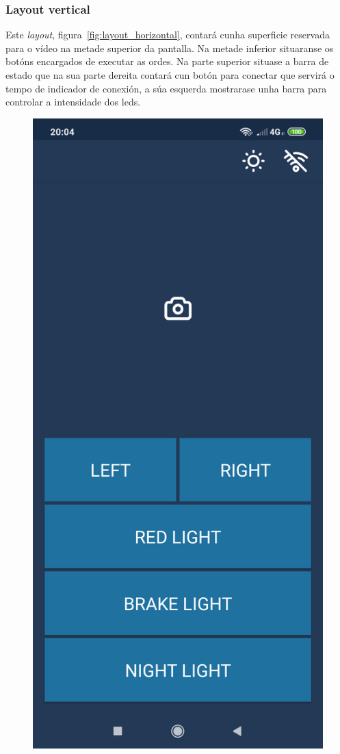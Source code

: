 \subsubsection{Layout vertical}
Este \emph{layout}, figura~\ref{fig:layout_horizontal}, contará cunha superficie reservada para o vídeo na metade superior da pantalla. Na metade inferior situaranse os botóns encargados de executar as ordes. Na parte superior situase a barra de estado que na sua parte dereita contará cun botón para conectar que servirá o tempo de indicador de conexión, a súa esquerda mostrarase unha barra para controlar a intensidade dos leds.
\begin{figure}[tb]
  \centering
  \includegraphics[scale=.1]{imaxes/layout-vertical1.png}

\end{figure}
